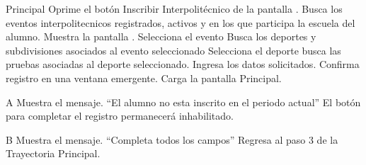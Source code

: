     \begin{UCtrayectoria}{Principal}
    \UCpaso[\UCactor] Oprime el botón Inscribir Interpolitécnico de la pantalla .
    \UCpaso Busca los eventos interpolitecnicos registrados, activos y en los que participa la escuela del alumno.
    \UCpaso Muestra la pantalla .
	\UCpaso[\UCactor] Selecciona el evento 
	\UCpaso Busca los deportes y subdivisiones asociados al evento seleccionado
	\UCpaso[\UCactor] Selecciona el deporte
    \UCpaso busca las pruebas asociadas al deporte seleccionado.
    \UCpaso[\UCactor] Ingresa los datos solicitados.  
    \UCpaso Confirma registro en una ventana emergente.
    \UCpaso Carga la pantalla Principal.
    \end{UCtrayectoria}
    
	\begin{UCtrayectoriaA}{A}{}
		\UCpaso Muestra el mensaje. “El alumno no esta inscrito en el periodo actual”
		\UCpaso El botón para completar el registro permanecerá inhabilitado.

	\end{UCtrayectoriaA}
	
	\begin{UCtrayectoriaA}{B}{}
		\UCpaso Muestra el mensaje. “Completa todos los campos”
		\UCpaso Regresa al paso 3 de la Trayectoria Principal.

	\end{UCtrayectoriaA}